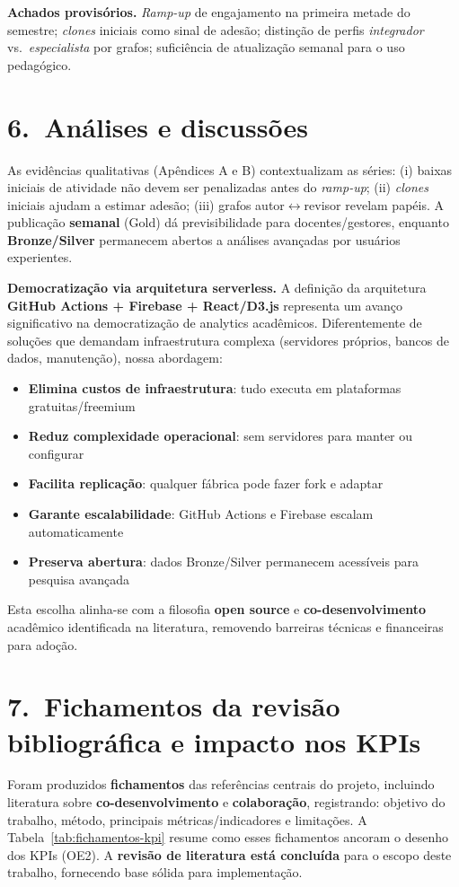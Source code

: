 \documentclass[
	12pt,
	openright,
	oneside,
	a4paper,
	brazil
]{abntex2}
\begin{document}
\textbf{Achados provisórios.} \emph{Ramp-up} de engajamento na primeira metade do semestre; \emph{clones} iniciais como sinal de adesão; distinção de perfis \emph{integrador} vs.\ \emph{especialista} por grafos; suficiência de atualização semanal para o uso pedagógico.

\section*{6.\ Análises e discussões}
As evidências qualitativas (Apêndices A e B) contextualizam as séries: (i) baixas iniciais de atividade não devem ser penalizadas antes do \emph{ramp-up}; (ii) \emph{clones} iniciais ajudam a estimar adesão; (iii) grafos autor$\leftrightarrow$revisor revelam papéis. A publicação \textbf{semanal} (Gold) dá previsibilidade para docentes/gestores, enquanto \textbf{Bronze/Silver} permanecem abertos a análises avançadas por usuários experientes.

\textbf{Democratização via arquitetura serverless.} A definição da arquitetura \textbf{GitHub Actions + Firebase + React/D3.js} representa um avanço significativo na democratização de analytics acadêmicos. Diferentemente de soluções que demandam infraestrutura complexa (servidores próprios, bancos de dados, manutenção), nossa abordagem:
\begin{itemize}
    \item \textbf{Elimina custos de infraestrutura}: tudo executa em plataformas gratuitas/freemium
    \item \textbf{Reduz complexidade operacional}: sem servidores para manter ou configurar
    \item \textbf{Facilita replicação}: qualquer fábrica pode fazer fork e adaptar
    \item \textbf{Garante escalabilidade}: GitHub Actions e Firebase escalam automaticamente
    \item \textbf{Preserva abertura}: dados Bronze/Silver permanecem acessíveis para pesquisa avançada
\end{itemize}
Esta escolha alinha-se com a filosofia \textbf{open source} e \textbf{co-desenvolvimento} acadêmico identificada na literatura, removendo barreiras técnicas e financeiras para adoção.

\section*{7.\ Fichamentos da revisão bibliográfica e impacto nos KPIs}
\label{sec:fichamentos}
Foram produzidos \textbf{fichamentos} das referências centrais do projeto, incluindo literatura sobre \textbf{co-desenvolvimento} e \textbf{colaboração}, registrando: objetivo do trabalho, método, principais métricas/indicadores e limitações. A Tabela~\ref{tab:fichamentos-kpi} resume como esses fichamentos ancoram o desenho dos KPIs (OE2). A \textbf{revisão de literatura está concluída} para o escopo deste trabalho, fornecendo base sólida para implementação.
\end{document}
